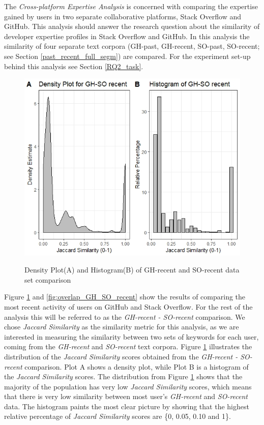         The \emph{Cross-platform Expertise Analysis} is concerned with comparing the expertise gained by users in two separate collaborative platforms, Stack Overflow and GitHub. This analysis should answer the research question about the similarity of developer expertise profiles in Stack Overflow and GitHub. In this analysis the similarity of four separate text corpora (GH-past, GH-recent, SO-past, SO-recent; see Section \ref{past_recent_full_segm}) are compared. For the experiment set-up behind this analysis see Section \ref{RQ2_task}.
        
        \begin{figure}
          \centering
          \includegraphics[width=\textwidth]{figures/GH_SO_recent.jpeg}\\
          \caption{Density Plot(A) and Histogram(B) of GH-recent and SO-recent data set comparison}
          \label{fig:GH_SO_recent}
        \end{figure}
        
        Figure \ref{fig:GH_SO_recent} and \ref{fig:overlap_GH_SO_recent} show the results of comparing the most recent activity of users on GitHub and Stack Overflow. For the rest of the analysis this will be referred to as the \emph{GH-recent - SO-recent} comparison. We chose \emph{Jaccard Similarity} as the similarity metric for this analysis, as we are interested in measuring the similarity between two sets of keywords for each user, coming from the \emph{GH-recent} and \emph{SO-recent} text corpora. Figure \ref{fig:GH_SO_recent} illustrates the distribution of the \emph{Jaccard Similarity} scores obtained from the \emph{GH-recent - SO-recent} comparison. Plot A shows a density plot, while Plot B is a  histogram of the \emph{Jaccard Similarity} scores. The distribution from Figure \ref{fig:GH_SO_recent} shows that the majority of the population has very low \emph{Jaccard Similarity} scores, which means that there is very low similarity between most user's \emph{GH-recent} and \emph{SO-recent} data. The histogram paints the most clear picture by showing that the highest relative percentage of \emph{Jaccard Similarity} scores are \{0, 0.05, 0.10 and 1\}.
        
